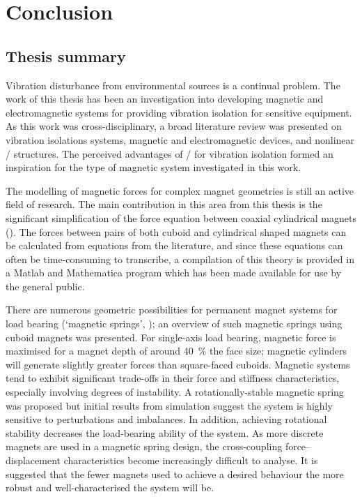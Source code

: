 \documentclass[11pt,a4paper]{memoir}
\begin{document}
\chapter{Conclusion}


\section{Thesis summary}

Vibration disturbance from environmental sources is a continual problem.
The work of this thesis has been an investigation into developing magnetic and electromagnetic systems for providing vibration isolation for sensitive equipment.
As this work was cross-disciplinary, a broad literature review was presented on vibration isolations systems, magnetic and electromagnetic devices, and nonlinear \qzs/ structures.
The perceived advantages of \qzs/ for vibration isolation formed an inspiration for the type of magnetic system investigated in this work.

The modelling of magnetic forces for complex magnet geometries is still an active field of research.
The main contribution in this area from this thesis is the significant simplification of the force equation between coaxial cylindrical magnets ().
The forces between pairs of both cuboid and cylindrical shaped magnets can be calculated from equations from the literature, and since these equations can often be time-consuming to transcribe, a compilation of this theory is provided in a Matlab and Mathematica program which has been made available for use by the general public.

There are numerous geometric possibilities for permanent magnet systems for load bearing (`magnetic springs', ); an overview of such magnetic springs using cuboid magnets was presented.
For single-axis load bearing, magnetic force is maximised for a magnet depth of around \SI{40}{\%} the face size; magnetic cylinders will generate slightly greater forces than square-faced cuboids.
Magnetic systems tend to exhibit significant trade-offs in their force and stiffness characteristics, especially involving degrees of instability.
A rotationally-stable magnetic spring was proposed but initial results from simulation suggest the system is highly sensitive to perturbations and imbalances.
In addition, achieving rotational stability decreases the load-bearing ability of the system.
As more discrete magnets are used in a magnetic spring design, the cross-coupling force--displacement characteristics become increasingly difficult to analyse.
It is suggested that the fewer magnets used to achieve a desired behaviour the more robust and well-characterised the system will be.
\end{document}
